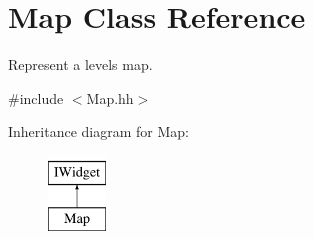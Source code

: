 \hypertarget{classMap}{}\section{Map Class Reference}
\label{classMap}


Represent a level\textquotesingle{}s map.  




{\ttfamily \#include $<$Map.\+hh$>$}

Inheritance diagram for Map\+:\begin{figure}[H]
\begin{center}
\leavevmode
\includegraphics[height=2.000000cm]{classMap}
\end{center}
\end{figure}
